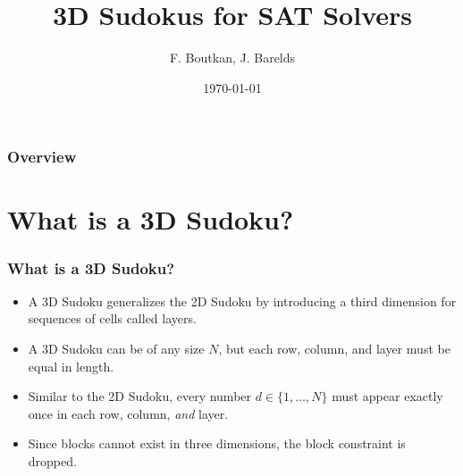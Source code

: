\documentclass{beamer}
\title[3D Sudokus]{3D Sudokus for SAT Solvers} %
\author{F. Boutkan, J. Barelds} %
\institute[UvA] %
{
University of Amsterdam \\ %
}
\date{\today} %
\begin{document}
\begin{frame}
\titlepage %
\end{frame}

\begin{frame}
\frametitle{Overview} %
\tableofcontents %
\end{frame}


\section{What is a 3D Sudoku?} %

\begin{frame}
\frametitle{What is a 3D Sudoku?}

\begin{itemize}
	\item A 3D Sudoku generalizes the 2D Sudoku by introducing a third dimension for sequences of cells called layers.
	\item A 3D Sudoku can be of any size $N$, but each row, column, and layer must be equal in length.
	\item Similar to the 2D Sudoku, every number $d \in \{1, \hdots, N\}$ must appear exactly once in each row, column, \emph{and} layer.
	\item Since blocks cannot exist in three dimensions, the block constraint is dropped.
\end{itemize}

\end{frame}
\end{document}
